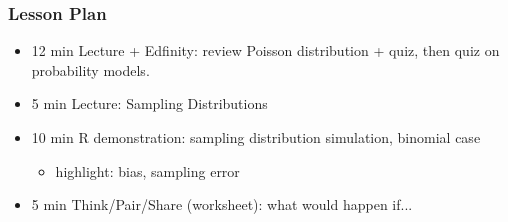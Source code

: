 

\begin{frame}
\frametitle{Lesson Plan}
\begin{itemize}
    \item 12 min Lecture + Edfinity: review Poisson distribution + quiz, then quiz on probability models.

    \item 5 min Lecture: Sampling Distributions
    \item 10 min R demonstration: sampling distribution simulation, binomial case
    \begin{itemize}
        \item  highlight: bias, sampling error
    \end{itemize}
    \item 5 min Think/Pair/Share (worksheet): what would happen if...

\end{itemize}
\end{frame}



